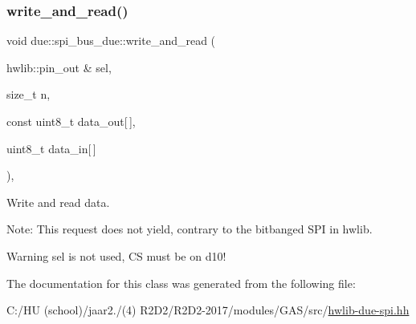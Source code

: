 \subsubsection{\texorpdfstring{write\+\_\+and\+\_\+read()}{write\_and\_read()}}
{\footnotesize\ttfamily void due\+::spi\+\_\+bus\+\_\+due\+::write\+\_\+and\+\_\+read (\begin{DoxyParamCaption}\item[{hwlib\+::pin\+\_\+out \&}]{sel,  }\item[{size\+\_\+t}]{n,  }\item[{const uint8\+\_\+t}]{data\+\_\+out\mbox{[}$\,$\mbox{]},  }\item[{uint8\+\_\+t}]{data\+\_\+in\mbox{[}$\,$\mbox{]} }\end{DoxyParamCaption})\hspace{0.3cm}{\ttfamily [inline]}, {\ttfamily [override]}}



Write and read data. 

Note\+: This request does not yield, contrary to the bitbanged S\+PI in hwlib.

\begin{DoxyWarning}{Warning}
{\ttfamily sel} is not used, CS must be on d10! 
\end{DoxyWarning}


The documentation for this class was generated from the following file\+:\begin{DoxyCompactItemize}
\item 
C\+:/\+H\+U (school)/jaar2./(4) R2\+D2/\+R2\+D2-\/2017/modules/\+G\+A\+S/src/\hyperlink{hwlib-due-spi_8hh}{hwlib-\/due-\/spi.\+hh}\end{DoxyCompactItemize}

